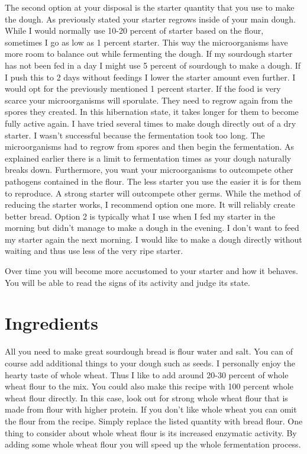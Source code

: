 The second option at your disposal is the starter quantity that
you use to make the dough. As previously stated your starter
regrows inside of your main dough. While I would normally use
10-20 percent of starter based on the flour, sometimes I go
as low as 1 percent starter. This way the microorganisms have
more room to balance out while fermenting the dough. If my sourdough
starter has not been fed in a day I might use 5 percent of sourdough
to make a dough.  If I push this to 2 days without feedings
I lower the starter amount even further. I would opt for the
previously mentioned 1 percent starter. If the food is very scarce
your microorganisms will sporulate. They need to regrow again
from the spores they created. In this hibernation state, it takes
longer for them to become fully active again. I have tried
several times to make dough directly out of a dry starter.
I wasn't successful because the fermentation took too long.
The microorganisms had to regrow from spores and then begin
the fermentation. As explained earlier there is a limit to
fermentation times as your dough naturally breaks down.
Furthermore, you want your microorganisms to outcompete
other pathogens contained in the flour. The less starter
you use the easier it is for them to reproduce. A strong
starter will outcompete other germs. While the method of
reducing the starter works, I recommend option one more.
It will reliably create better bread. Option 2 is typically
what I use when I fed my starter in the morning but didn't
manage to make a dough in the evening. I don't want to feed
my starter again the next morning. I would like to make a dough
directly without waiting and thus use less of the very ripe starter.

Over time you will become more accustomed to your starter
and how it behaves. You will be able to read the signs of its
activity and judge its state.

\section{Ingredients}

All you need to make great sourdough bread is flour water and salt. You
can of course add additional things to your dough such as seeds. I personally
enjoy the hearty taste of whole wheat. Thus I like to add around 20-30 percent
of whole wheat flour to the mix. You could also make this recipe with 100 percent
whole wheat flour directly. In this case, look out for strong whole wheat
flour that is made from flour with higher protein. If you don't like whole
wheat you can omit the flour from the recipe. Simply replace the listed
quantity with bread flour. One thing to consider about whole wheat
flour is its increased enzymatic activity. By adding some whole wheat
flour you will speed up the whole fermentation process.

